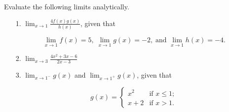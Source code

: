 \documentclass[cal1spr16Lectures.tex]{subfiles}
\begin{document}
\begin{frame}\footnotesize
\begin{exe} Evaluate the following limits analytically.
\begin{itemize}
\item[1.\quad] $\lim_{x \to 1}\frac{4f(x)g(x)}{h(x)}$, given that 

\vspace{-0.25pc}
\[\lim_{x \to 1} f(x)=5, \; \lim_{x \to 1} g(x)=-2, \;\text{and }\lim_{x \to 1} h(x)=-4.\]

\vspace{0.1pc}
\item[2.\quad] $\lim_{x \to 3} \frac{4x^2+3x-6}{2x-3}$

\vspace{0.5pc}
\item[3.\quad] $\lim_{x \to 1^-}g(x)$ \;and\; $\lim_{x \to 1^+}g(x)$, given that

\vspace{-0.25pc}
\[g(x) = 
\begin{cases}
x^2 & \text{if $x \le 1$}; \\
x+2 & \text{if $x>1$}.
\end{cases}
\] 
\end{itemize}
\end{exe}
\end{frame}
\end{document}

